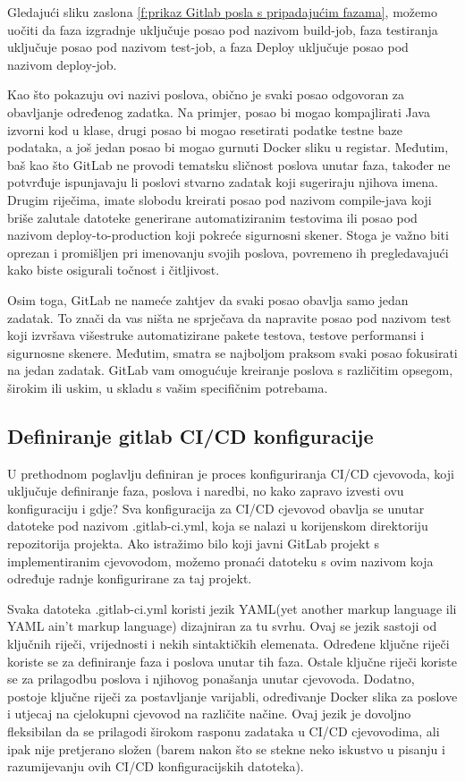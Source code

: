 \documentclass[a4paper,12pt,oneside]{article}
\begin{document}
Gledajući sliku zaslona \ref{f:prikaz Gitlab posla s pripadajućim fazama}, možemo uočiti da faza izgradnje uključuje posao pod nazivom build-job, faza testiranja uključuje posao pod nazivom test-job, a faza Deploy uključuje posao pod nazivom deploy-job.

Kao što pokazuju ovi nazivi poslova, obično je svaki posao odgovoran za obavljanje određenog zadatka. Na primjer, posao bi mogao kompajlirati Java izvorni kod u klase, drugi posao bi mogao resetirati podatke testne baze podataka, a još jedan posao bi mogao gurnuti Docker sliku u registar. Međutim, baš kao što GitLab ne provodi tematsku sličnost poslova unutar faza, također ne potvrđuje ispunjavaju li poslovi stvarno zadatak koji sugeriraju njihova imena. Drugim riječima, imate slobodu kreirati posao pod nazivom compile-java koji briše zalutale datoteke generirane automatiziranim testovima ili posao pod nazivom deploy-to-production koji pokreće sigurnosni skener. Stoga je važno biti oprezan i promišljen pri imenovanju svojih poslova, povremeno ih pregledavajući kako biste osigurali točnost i čitljivost.

Osim toga, GitLab ne nameće zahtjev da svaki posao obavlja samo jedan zadatak. To znači da vas ništa ne sprječava da napravite posao pod nazivom test koji izvršava višestruke automatizirane pakete testova, testove performansi i sigurnosne skenere. Međutim, smatra se najboljom praksom svaki posao fokusirati na jedan zadatak. GitLab vam omogućuje kreiranje poslova s različitim opsegom, širokim ili uskim, u skladu s vašim specifičnim potrebama.


\subsection{Definiranje gitlab CI/CD konfiguracije}

U prethodnom poglavlju definiran je proces konfiguriranja CI/CD cjevovoda, koji uključuje definiranje faza, poslova i naredbi, no kako zapravo izvesti ovu konfiguraciju i gdje? Sva konfiguracija za CI/CD cjevovod obavlja se unutar datoteke pod nazivom .gitlab-ci.yml, koja se nalazi u korijenskom direktoriju repozitorija projekta. Ako istražimo bilo koji javni GitLab projekt s implementiranim cjevovodom, možemo pronaći datoteku s ovim nazivom koja određuje radnje konfigurirane za taj projekt.

Svaka datoteka .gitlab-ci.yml koristi jezik YAML(yet another markup language ili YAML ain't markup language) dizajniran za tu svrhu. Ovaj se jezik sastoji od ključnih riječi, vrijednosti i nekih sintaktičkih elemenata. Određene ključne riječi koriste se za definiranje faza i poslova unutar tih faza. Ostale ključne riječi koriste se za prilagodbu poslova i njihovog ponašanja unutar cjevovoda. Dodatno, postoje ključne riječi za postavljanje varijabli, određivanje Docker slika za poslove i utjecaj na cjelokupni cjevovod na različite načine. Ovaj jezik je dovoljno fleksibilan da se prilagodi širokom rasponu zadataka u CI/CD cjevovodima, ali ipak nije pretjerano složen (barem nakon što se stekne neko iskustvo u pisanju i razumijevanju ovih CI/CD konfiguracijskih datoteka).
\end{document}
